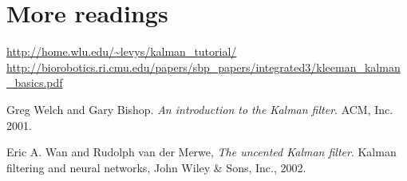 \documentclass[12pt]{article}
\begin{document}
\section{More readings}
\noindent
\url{http://home.wlu.edu/~levys/kalman_tutorial/} \\
\url{http://biorobotics.ri.cmu.edu/papers/sbp_papers/integrated3/kleeman_kalman_basics.pdf}


\begin{thebibliography}{9}

Greg Welch and Gary Bishop.
\textit{An introduction to the Kalman filter}. 
ACM, Inc. 2001.

Eric A. Wan and Rudolph van der Merwe, 
\textit{The uncented Kalman filter}. 
Kalman filtering and neural networks, John Wiley \& Sons, Inc., 2002.

\end{thebibliography}
\end{document}
